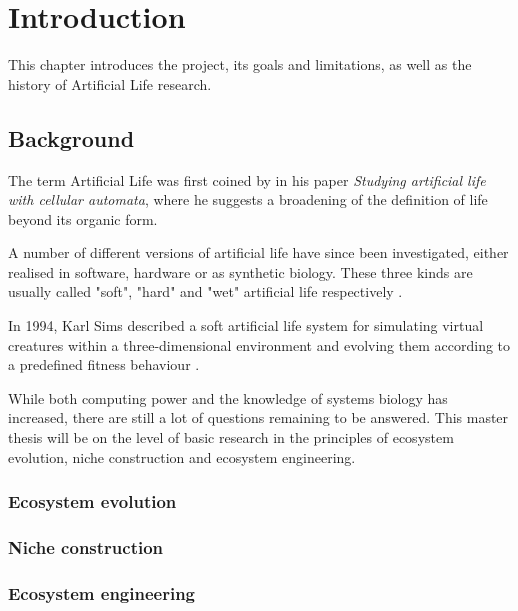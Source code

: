 \chapter{Introduction}
This chapter introduces the project, its goals and limitations, as well as the history of Artificial Life research. 

\section{Background} \label{Section_ref}
The term Artificial Life was first coined by \cite{langton1986studying} in his paper \emph{Studying artificial life with cellular automata}, where he suggests a broadening of the definition of life beyond its organic form.


A number of different versions of artificial life have since been investigated, either realised in software, hardware or as synthetic biology. These three kinds are usually called "soft", "hard" and "wet" artificial life respectively \citep{bedau2003artificial}.

In 1994, Karl Sims described a soft artificial life system for simulating virtual creatures within a three-dimensional environment and evolving them according to a predefined fitness behaviour \citep{sims1994evolving}.


While both computing power and the knowledge of systems biology has increased, there are still a lot of questions remaining to be answered. This master thesis will be on the level of basic research in the principles of ecosystem evolution, niche construction and ecosystem engineering.

\subsection{Ecosystem evolution}

\subsection{Niche construction}

\subsection{Ecosystem engineering}

